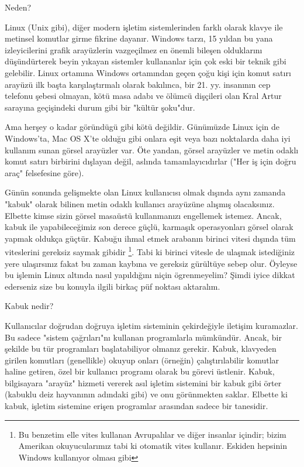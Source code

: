 \begin{section}{Neden?}

Linux (Unix gibi), diğer modern işletim sistemlerinden farklı olarak klavye ile metinsel komutlar girme fikrine dayanır. Windows tarzı, 15 yıldan bu yana izleyicilerini grafik arayüzlerin vazgeçilmez en önemli bileşen olduklarını düşündürterek beyin yıkayan sistemler kullananlar için çok eski bir teknik gibi gelebilir. Linux ortamına Windows ortamından geçen çoğu kişi için komut satırı arayüzü ilk başta karşılaştırmalı olarak bakılınca, bir 21. yy. insanının cep telefonu şebesi olmayan, kötü masa adabı ve ölümcü dişçileri olan Kral Artur sarayına geçişindeki durum gibi bir "kültür şoku"dur.

Ama herşey o kadar göründügü gibi kötü değildir. Günümüzde Linux için de Windows'ta, Mac OS X'te olduğu gibi onlara eşit veya bazı noktalarda daha iyi kullanım sunan görsel arayüzler var. Öte yandan, görsel arayüzler ve metin odaklı komut satırı birbirini dışlayan değil, aslında tamamlayıcıdırlar ("Her iş için doğru araç" felsefesine göre).

Günün sonunda gelişmekte olan Linux kullanıcısı olmak dışında aynı zamanda "kabuk" olarak bilinen metin odaklı kullanıcı arayüzüne alışmış olacaksınız. Elbette kimse sizin görsel masaüstü kullanmanızı engellemek istemez. Ancak, kabuk ile yapabileceğimiz son derece güçlü, karmaşık operasyonları görsel olarak yapmak oldukça güçtür. Kabuğu ihmal etmek arabanın birinci vitesi dışında tüm viteslerini gereksiz saymak gibidir
\footnote{Bu benzetim elle vites kullanan Avrupalılar ve diğer insanlar içindir; bizim Amerikan okuyucularımız tabi ki otomatik vites kullanır.
Eskiden hepsinin Windows kullanıyor olması gibi}. Tabi ki birinci vitesle de ulaşmak istediğiniz yere ulaşırsınız fakat bu zaman kaybına ve gereksiz gürültüye sebep olur. Öyleyse bu işlemin Linux altında nasıl yapıldığını niçin ögrenmeyelim? Şimdi iyice dikkat ederseniz size bu konuyla ilgili birkaç püf noktası aktaralım.

\begin{subsection}{Kabuk nedir?}

Kullanıcılar doğrudan doğruya işletim sisteminin çekirdeğiyle iletişim kuramazlar. Bu sadece "sistem çağrıları"nı kullanan programlarla mümkündür. Ancak, bir şekilde bu tür programları başlatabiliyor olmanız gerekir. Kabuk, klavyeden girilen komutları (genellikle) okuyup onları (örneğin) çalıştırılabilir komutlar haline getiren, özel bir kullanıcı programı olarak bu görevi üstlenir. Kabuk, bilgisayara "arayüz" hizmeti vererek asıl işletim sistemini bir kabuk gibi örter (kabuklu deiz hayvanının adındaki gibi) ve onu görünmekten saklar. Elbette ki kabuk, işletim sistemine erişen programlar arasından sadece bir tanesidir.


\end{subsection}
\end{section}
